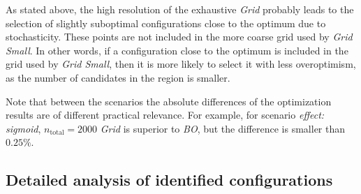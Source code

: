 \documentclass[bimj,fleqn]{w-art}
\theoremstyle{plain}
\theoremstyle{definition}
\begin{document}
As stated above, the high resolution of the exhaustive \emph{Grid} probably leads to the selection of slightly suboptimal configurations close to the optimum due to stochasticity.
These points are not included in the more coarse grid used by \emph{Grid Small}.
In other words, if a configuration close to the optimum is included in the grid used by \emph{Grid Small}, then it is more likely to select it with less overoptimism, as the number of candidates in the region is smaller.

Note that between the scenarios the absolute differences of the optimization results are of different practical relevance. For example, for scenario \emph{effect: sigmoid}, $n_{\text{total}} = 2000$ \emph{Grid} is superior to \emph{BO}, but the difference is smaller than $0.25\%$.


\subsection{Detailed analysis of identified configurations}
\end{document}
